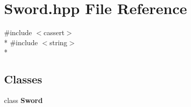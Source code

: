 \section{Sword.\-hpp File Reference}
\label{_sword_8hpp}
{\ttfamily \#include $<$cassert$>$}\\*
{\ttfamily \#include $<$string$>$}\\*
\subsection*{Classes}
\begin{DoxyCompactItemize}
\item 
class {\bf Sword}
\end{DoxyCompactItemize}

